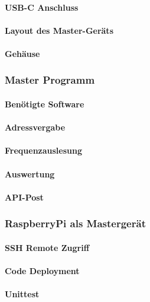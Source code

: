 \paragraph{USB-C Anschluss}
\paragraph{Layout des Master-Geräts}
\paragraph{Gehäuse}

\subsubsection{Master Programm}
\paragraph{Benötigte Software}
\paragraph{Adressvergabe}
\paragraph{Frequenzauslesung}

\paragraph{Auswertung}
\paragraph{API-Post}

\subsubsection{RaspberryPi als Mastergerät}
\paragraph{SSH Remote Zugriff}
\paragraph{Code Deployment}
\paragraph{Unittest}

\pagebreak


